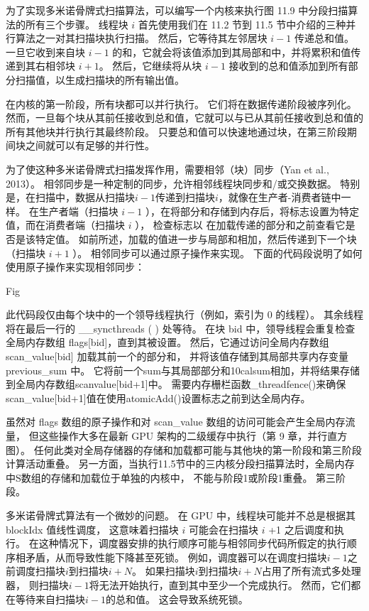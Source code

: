 为了实现多米诺骨牌式扫描算法，可以编写一个内核来执行图 11.9 中分段扫描算法的所有三个步骤。 
线程块 $i$ 首先使用我们在 11.2 节到 11.5 节中介绍的三种并行算法之一对其扫描块执行扫描。 
然后，它等待其左邻居块 $i-1$ 传递总和值。 
一旦它收到来自块 $i-1$ 的和，它就会将该值添加到其局部和中，并将累积和值传递到其右相邻块 $i+1$。 
然后，它继续将从块 $i-1$ 接收到的总和值添加到所有部分扫描值，以生成扫描块的所有输出值。

在内核的第一阶段，所有块都可以并行执行。 它们将在数据传递阶段被序列化。 
然而，一旦每个块从其前任接收到总和值，它就可以与已从其前任接收到总和值的所有其他块并行执行其最终阶段。 
只要总和值可以快速地通过块，在第三阶段期间块之间就可以有足够的并行性。

为了使这种多米诺骨牌式扫描发挥作用，需要相邻（块）同步（Yan et al., 2013）。 
相邻同步是一种定制的同步，允许相邻线程块同步和/或交换数据。 
特别是，在扫描中，数据从扫描块$i-1$传递到扫描块$i$，就像在生产者-消费者链中一样。 
在生产者端（扫描块 $i-1$ ），在将部分和存储到内存后，将标志设置为特定值，而在消费者端（扫描块 $i$ ），
检查标志以 在加载传递的部分和之前查看它是否是该特定值。 
如前所述，加载的值进一步与局部和相加，然后传递到下一个块（扫描块 $i+1$ ）。 
相邻同步可以通过原子操作来实现。 下面的代码段说明了如何使用原子操作来实现相邻同步：

{\color{red} Fig}

此代码段仅由每个块中的一个领导线程执行（例如，索引为 0 的线程）。 
其余线程将在最后一行的 \_\_syncthreads ( ) 处等待。 
在块 bid 中，领导线程会重复检查全局内存数组 flags[bid]，直到其被设置。 
然后，它通过访问全局内存数组 scan\_value[bid] 加载其前一个的部分和，
并将该值存储到其局部共享内存变量 previous\_sum 中。 
它将前一个sum与其局部部分和10calsum相加，并将结果存储到全局内存数组scanvalue[bid+1]中。 
需要内存栅栏函数\_threadfence()来确保scan\_value[bid+1]值在使用atomicAdd()设置标志之前到达全局内存。

虽然对 flags 数组的原子操作和对 scan\_value 数组的访问可能会产生全局内存流量，
但这些操作大多在最新 GPU 架构的二级缓存中执行（第 9 章，并行直方图）。 
任何此类对全局存储器的存储和加载都可能与其他块的第一阶段和第三阶段计算活动重叠。 
另一方面，当执行11.5节中的三内核分段扫描算法时，全局内存中$\mathrm{S}$数组的存储和加载位于单独的内核中，
不能与阶段1或阶段1重叠。 第三阶段。

多米诺骨牌式算法有一个微妙的问题。 在 GPU 中，线程块可能并不总是根据其 blockIdx 值线性调度，
这意味着扫描块 $i$ 可能会在扫描块 $i$ +1 之后调度和执行。 
在这种情况下，调度器安排的执行顺序可能与相邻同步代码所假定的执行顺序相矛盾，从而导致性能下降甚至死锁。 
例如，调度器可以在调度扫描块$i-1$之前调度扫描块$i$到扫描块$i+N$。 如果扫描块$i$到扫描块$i+N$占用了所有流式多处理器，
则扫描块$i-1$将无法开始执行，直到其中至少一个完成执行。 然而，它们都在等待来自扫描块$i-1$的总和值。 这会导致系统死锁。

